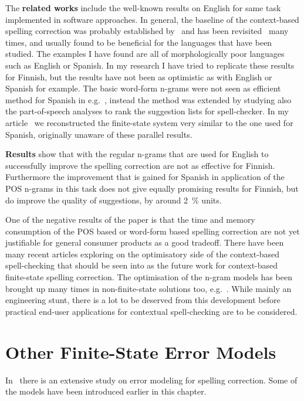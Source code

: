 \documentclass[officiallayout,draft]{unihelcompling}
\begin{document}
The \textbf{related works} include the well-known results on English for same
task implemented in software approaches.  In general, the baseline of the
context-based spelling correction was probably established
by~\citet{mays1991context} and has been
revisited~\citep{wilcox-ohearn2008realword} many times, and usually found to be
beneficial for the languages that have been studied. The examples I have found
are all of morphologically poor languages such as English or Spanish. In my
research I have tried to replicate these results for Finnish, but the results
have not been as optimistic as with English or Spanish for example.  The basic
word-form n-grams were not seen as efficient method for Spanish in
e.g.~\citet{otero2007contextual}, instead the method was extended by studying
also the part-of-speech analyses to rank the suggestion lists for
spell-checker. In my article~ we
reconstructed the finite-state system very similar to the one used for Spanish,
originally unaware of these parallel results.

\textbf{Results} show that with the regular n-grams that are used for English
to successfully improve the spelling correction are not as effective for 
Finnish. Furthermore the improvement that is gained for Spanish in application
of the POS n-grams in this task does not give equally promising results for
Finnish, but do improve the quality of suggestions, by around 2~\% 
units.

One of the negative results of the paper is that the time and memory
consumption of the POS based or word-form based spelling correction are not yet
justifiable for general consumer products as a good tradeoff. There have been
many recent articles exploring on the optimisatory side of the context-based
spell-checking that should be seen into as the future work for context-based
finite-state spelling correction. The optimisation of the n-gram models has
been brought up many times in non-finite-state solutions too,
e.g.~\citep{church2007compressing}. While mainly an engineering stunt, there is
a lot to be deserved from this development before practical end-user
applications for contextual spell-checking are to be considered.

\section{Other Finite-State Error Models}
\label{sec:other-errors}

In~\citet{deorowicz2005correcting} there is an extensive study on error
modeling for spelling correction. Some of the models have been
introduced earlier in this chapter.
\end{document}
